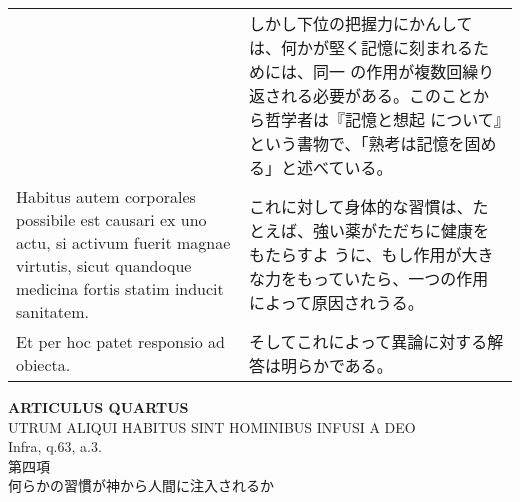 \documentclass[10pt]{jsarticle} %
\begin{document}
\begin{longtable}{p{21em}p{21em}}
&

しかし下位の把握力にかんしては、何かが堅く記憶に刻まれるためには、同一
の作用が複数回繰り返される必要がある。このことから哲学者は『記憶と想起
について』という書物で、「熟考は記憶を固める」と述べている。

\\

Habitus autem corporales possibile est causari ex uno actu, si activum
fuerit magnae virtutis, sicut quandoque medicina fortis statim inducit
sanitatem.



&

これに対して身体的な習慣は、たとえば、強い薬がただちに健康をもたらすよ
うに、もし作用が大きな力をもっていたら、一つの作用によって原因されうる。

\\



Et per hoc patet responsio ad obiecta.

&

そしてこれによって異論に対する解答は明らかである。

\end{longtable}
\newpage


\begin{center}
{\Large {\bf ARTICULUS QUARTUS}}\\ {\large UTRUM ALIQUI HABITUS SINT
HOMINIBUS INFUSI A DEO}\\ {\footnotesize Infra, q.63, a.3.}\\ {\Large
第四項\\何らかの習慣が神から人間に注入されるか}
\end{center}
\end{document}
